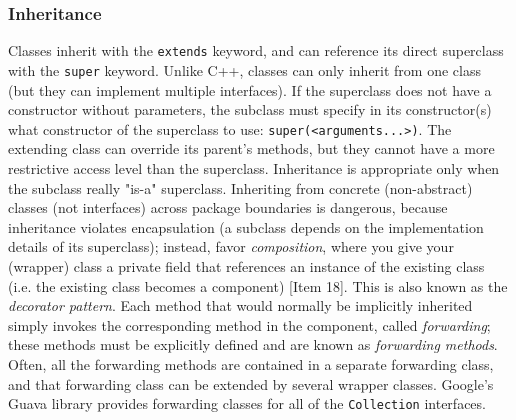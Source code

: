 \documentclass[8pt, table, xcdraw]{article}%
\begin{document}
\subsubsection{Inheritance}

Classes inherit with the \lstinline{extends} keyword, and can reference its direct superclass with the \lstinline{super} keyword. Unlike C++, classes can only inherit from one class (but they can implement multiple interfaces). If the superclass does not have a constructor without parameters, the subclass must specify in its constructor(s) what constructor of the superclass to use: \lstinline{super(<arguments...>)}. The extending class can override its parent's methods, but they cannot have a more restrictive access level than the superclass. Inheritance is appropriate only when the subclass really "is-a" superclass. Inheriting from concrete (non-abstract) classes (not interfaces) across package boundaries is dangerous, because inheritance violates encapsulation (a subclass depends on the implementation details of its superclass); instead, favor \emph{composition}, where you give your (wrapper) class a private field that references an instance of the existing class (i.e. the existing class becomes a component) [Item 18]. This is also known as the \emph{decorator pattern}. Each method that would normally be implicitly inherited simply invokes the corresponding method in the component, called \emph{forwarding}; these methods must be explicitly defined and are known as \emph{forwarding methods}. Often, all the forwarding methods are contained in a separate forwarding class, and that forwarding class can be extended by several wrapper classes. Google's Guava library provides forwarding classes for all of the \lstinline{Collection} interfaces.
\end{document}
